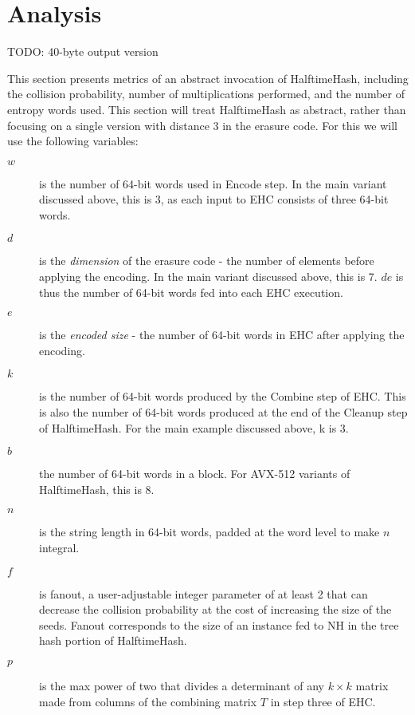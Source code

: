 \documentclass[sigconf, nonacm]{acmart}
\begin{document}


\section{Analysis}
\label{analysis}

TODO: 40-byte output version

This section presents metrics of an abstract invocation of HalftimeHash, including the collision probability, number of multiplications performed, and the number of entropy words used.
This section will treat HalftimeHash as abstract, rather than focusing on a single version with distance 3 in the erasure code.
For this we will use the following variables:

\begin {description}
\item[$w$] is the number of 64-bit words used in Encode step.
  In the main variant discussed above, this is 3, as each input to EHC consists of three 64-bit words.
\item[$d$] is the {\em dimension} of the erasure code - the number of elements before applying the encoding.
  In the main variant discussed above, this is 7.
  $de$ is thus the number of 64-bit words fed into each EHC execution.
\item[$e$] is the {\em encoded size} - the number of 64-bit words in EHC after applying the encoding.
\item[$k$] is the number of 64-bit words produced by the Combine step of EHC.
  This is also the number of 64-bit words produced at the end of the Cleanup step of HalftimeHash.
  For the main example discussed above, k is 3.
\item[$b$] the number of 64-bit words in a block.
  For AVX-512 variants of HalftimeHash, this is 8.
\item[$n$] is the string length in 64-bit words, padded at the word level to make $n$ integral.
\item[$f$] is fanout, a user-adjustable integer parameter of at least 2 that can decrease the collision probability at the cost of increasing the size of the seeds.
  Fanout corresponds to the size of an instance fed to NH in the tree hash portion of HalftimeHash.
\item[$p$] is the max power of two that divides a determinant of any $k \times k$ matrix made from columns of the combining matrix $T$ in step three of EHC.
\end{description}
\end{document}
